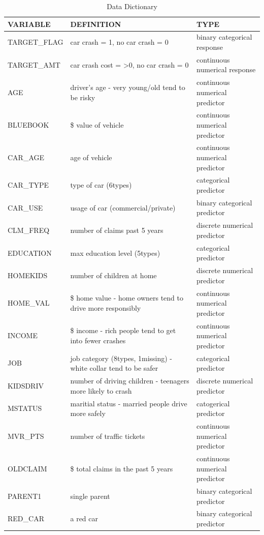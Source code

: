 \documentclass[]{article}
\begin{document}
\begin{table}

\caption{\label{tab:t1}Data Dictionary}
\centering
\begin{tabular}[t]{l|l|l}
\hline
VARIABLE & DEFINITION & TYPE\\
\hline
TARGET\_FLAG & car crash = 1, no car crash = 0 & binary categorical response\\
\hline
TARGET\_AMT & car crash cost = >0, no car crash = 0 & continuous numerical response\\
\hline
AGE & driver's age - very young/old tend to be risky & continuous numerical predictor\\
\hline
BLUEBOOK & \$ value of vehicle & continuous numerical predictor\\
\hline
CAR\_AGE & age of vehicle & continuous numerical predictor\\
\hline
CAR\_TYPE & type of car (6types) & categorical predictor\\
\hline
CAR\_USE & usage of car (commercial/private) & binary categorical predictor\\
\hline
CLM\_FREQ & number of claims past 5 years & discrete numerical predictor\\
\hline
EDUCATION & max education level (5types) & categorical predictor\\
\hline
HOMEKIDS & number of children at home & discrete numerical predictor\\
\hline
HOME\_VAL & \$ home value - home owners tend to drive more responsibly & continuous numerical predictor\\
\hline
INCOME & \$ income - rich people tend to get into fewer crashes & continuous numerical predictor\\
\hline
JOB & job category (8types, 1missing) - white collar tend to be safer & categorical predictor\\
\hline
KIDSDRIV & number of driving children - teenagers more likely to crash & discrete numerical predictor\\
\hline
MSTATUS & maritial status - married people drive more safely & catogerical predictor\\
\hline
MVR\_PTS & number of traffic tickets & continuous numerical predictor\\
\hline
OLDCLAIM & \$ total claims in the past 5 years & continuous numerical predictor\\
\hline
PARENT1 & single parent & binary categorical predictor\\
\hline
RED\_CAR & a red car & binary categorical predictor\\

\end{tabular}
\end{table}
\end{document}
